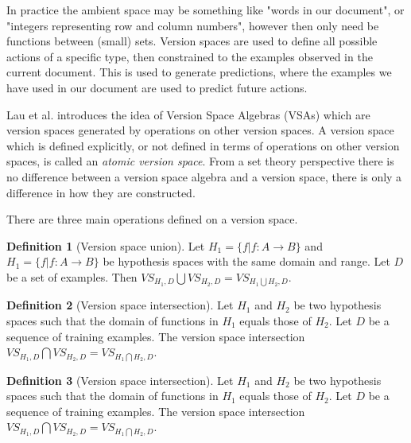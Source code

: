 \documentclass{article}
\theoremstyle{definition}
\newtheorem{definition}{Definition}[section]
\begin{document}
In practice the ambient space may be something like "words in our document", or "integers representing row and column numbers", however then only need be functions between (small) sets. Version spaces are used to define all possible actions of a specific type, then constrained to the examples observed in the current document. This is used to generate predictions, where the examples we have used in our document are used to predict future actions.

Lau et al.\cite{short} introduces the idea of Version Space Algebras (VSAs) which are version spaces generated by operations on other version spaces. A version space which is defined explicitly, or not defined in terms of operations on other version spaces, is called an \textit{atomic version space}. From a set theory perspective there is no difference between a version space algebra and a version space, there is only a difference in how they are constructed. 

There are three main operations defined on a version space. 
\begin{definition}[Version space union]
    Let $H_1 = \{f | f: A \rightarrow B\}$ and $H_1 = \{f | f: A \rightarrow B\}$ be hypothesis spaces with the same domain and range. Let $D$ be a set of examples. Then $VS_{H_1, D} \bigcup VS_{H_2, D} = VS_{H_1\bigcup H_2, D}$. 
\end{definition}

\begin{definition}[Version space intersection]
Let $H_1$ and $H_2$ be two hypothesis spaces such that the domain of functions in $H_1$ equals those of $H_2$. Let $D$ be a sequence of training examples. The version space intersection $VS_{H_1, D} \bigcap VS_{H_2, D} = VS_{H_1\bigcap H_2, D}$.
\end{definition}

\begin{definition}[Version space intersection]
Let $H_1$ and $H_2$ be two hypothesis spaces such that the domain of functions in $H_1$ equals those of $H_2$. Let $D$ be a sequence of training examples. The version space intersection $VS_{H_1, D} \bigcap VS_{H_2, D} = VS_{H_1\bigcap H_2, D}$.
\end{definition}
\end{document}
